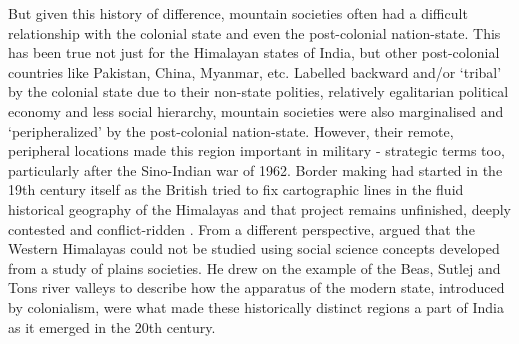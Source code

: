 But given this history of difference, mountain societies often had a difficult relationship with the colonial state and even the post-colonial nation-state. This has been true not just for the Himalayan states of India, but other post-colonial countries like Pakistan, China, Myanmar, etc. Labelled backward and/or ‘tribal’ by the colonial state due to their non-state polities, relatively egalitarian political economy and less social hierarchy, mountain societies were also marginalised and ‘peripheralized’ by the post-colonial nation-state. However, their remote, peripheral locations made this region important in military - strategic terms too, particularly after the Sino-Indian war of 1962. Border making had started in the 19th century itself as the British tried to fix cartographic lines in the fluid historical geography of the Himalayas and that project remains unfinished, deeply contested and conflict-ridden \citep{noorani2010india,guyot2017shadow,acharya2022boundaries}. From a different perspective, \cite{alam2008becoming} argued that the Western Himalayas could not be studied using social science concepts developed from a study of plains societies. He drew on the example of the Beas, Sutlej and Tons river valleys to describe how the apparatus of the modern state, introduced by colonialism, were what made these historically distinct regions a part of India as it emerged in the 20th century.

